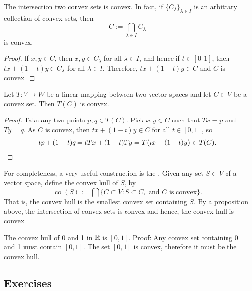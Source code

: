 \begin{prop}
The intersection two convex sets is convex.  In fact,
if $\{ C_\lambda \}_{\lambda \in I}$ is
an arbitrary collection of convex sets, then
\begin{equation*}
C := \bigcap_{\lambda \in I} C_\lambda
\end{equation*}
is convex.
\end{prop}

\begin{proof}
If $x, y \in C$, then $x,y \in C_\lambda$ for all
$\lambda \in I$, and hence if $t \in [0,1]$, then $tx + (1-t)y \in
C_\lambda$ for all $\lambda \in I$.  Therefore, $tx + (1-t)y \in C$ and $C$
is convex.
\end{proof}

\begin{prop}
Let $T \colon V \to W$ be a linear mapping between two vector spaces and
let $C \subset V$ be a convex set.  Then $T(C)$ is convex.
\end{prop}

\begin{proof}
Take any two points $p,q \in T(C)$.  Pick $x,y \in C$ such that
$Tx = p$ and $Ty=q$.  As $C$ is convex, then
$tx+(1-t)y \in C$
for all $t \in [0,1]$, so
\begin{equation*}
tp+(1-t)q 
=
tTx+(1-t)Ty
=
T\bigl(tx+(1-t)y\bigr)
\in T(C) .  \qedhere
\end{equation*}
\end{proof}

For completeness, a very useful construction is the
\emph{}.  Given any set $S \subset V$ of a vector
space, define the convex hull of $S$, by
\begin{equation*}
\operatorname{co}(S) :=
\bigcap \{ C \subset V : S \subset C, \text{ and $C$ is convex} \} .
\end{equation*}
That is, the convex hull is the smallest convex set containing $S$.  
By a proposition above, the intersection of convex sets is convex and
hence, the convex hull is convex.

\begin{example}
The convex hull of 0 and 1 in ${\mathbb{R}}$ is $[0,1]$.  Proof:
Any convex set containing 0 and 1 must contain $[0,1]$.  The set $[0,1]$
is convex, therefore it must be the convex hull.
\end{example}

\subsection{Exercises}

